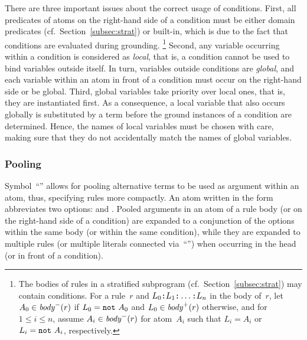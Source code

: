 There are three important issues about the correct usage of conditions.
First, all predicates of atoms on the right-hand side of a condition
must be either domain predicates (cf.\ Section~\ref{subsec:strat}) or built-in,
which is due to the fact that conditions are evaluated during grounding.%
\footnote{%
  The bodies of rules in a stratified subprogram (cf.\ Section~\ref{subsec:strat})
  may contain conditions.
  For a rule~$r$ and
  $L_0\texttt{:}L_1\texttt{:}\dots\texttt{:}L_n$
  in the body of~$r$,
  let $A_0\in\mathit{body}^-(r)$ if $L_0=\texttt{not}~A_0$
  and $L_0\in\mathit{body}^+(r)$ otherwise,
  and for $1\leq i\leq n$, 
  assume $A_i\in\mathit{body}^-(r)$ for atom~$A_i$
  such that $L_i=A_i$ or $L_i=\texttt{not}~A_i$, respectively.
  }
Second, any variable occurring within a condition is considered as \emph{local},
that is, a condition cannot be used to bind variables outside itself.
In turn, variables outside conditions are \emph{global}, and each variable
within an atom in front of a condition must occur on the right-hand side or
be global.
Third, global variables take priority over local ones, that is,
they are instantiated first.
As a consequence, a local variable that also occurs globally is substituted by a term
before the ground instances of a condition are determined.
Hence, the names of local variables must be chosen with care,
making sure that they do not accidentally match the names of global variables.

\subsubsection{Pooling}\label{subsec:gringo:pool}

Symbol~``\code{;}'' allows for pooling alternative terms to be used as
argument within an atom, thus, specifying rules more compactly.
An atom written in the form 
abbreviates two options:
 and .
Pooled arguments in an atom of a rule body 
(or on the right-hand side of a condition) are expanded to a conjunction
of the options within the same body (or within the same condition),
while they are expanded to multiple rules 
(or multiple literals connected via~``\code{,}'')
when occurring in the head (or in front of a condition).

